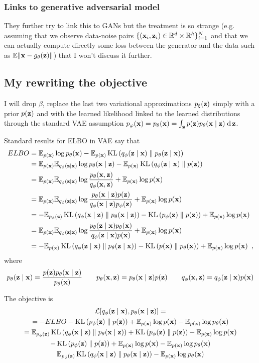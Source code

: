 \subsubsection{Links to generative adversarial model}

They further try to link this to GANs but the treatment is so strange (e.g. assuming that we observe data-noise pairs $\{(\bx_i, \bz_i) \in \mR^d \times \mR^h\}_{i=1}^N$ and that we can actually compute directly some loss between the generator and the data such as $\mE \norm{\bx - g_\theta(\bz)}$) that I won't discuss it further.

\subsection{My rewriting the objective}

I will drop $\beta$, replace the last two variational approximations $\pxz$ simply with a prior $p(\bz)$ and with the learned likelihood linked to the learned distributions through the standard VAE assumption
$p_\varphi(\bx) = p_\theta(\bx) = \int_\bz p(\bz) p_\theta(\bx \mid \bz) \dif \bz$.

Standard results for ELBO in VAE say that
\begin{align*}
ELBO & = \mE_{p(\bx)} \log p_\theta(\bx) - \mE_{p(\bx)} \KL{\qfz}{p_\theta(\bz \mid \bx)} \nn
& = \mE_{p(\bx)} \mE_{\qfz} \log \ptx - \mE_{p(\bx)} \KL{\qfz}{p(\bz)} \nn
& = \mE_{p(\bx)} \mE_{\qfz} \log \frac{p_\theta(\bx, \bz)}{q_\phi(\bx, \bz)} + \mE_{p(\bx)} \log p(\bx) \nn
& = \mE_{p(\bx)} \mE_{\qfz} \log \frac{p_\theta(\bx \mid \bz) p(\bz)}{q_\phi(\bx \mid \bz) p_\phi(\bz)} + \mE_{p(\bx)} \log p(\bx) \nn
& = - \mE_{p_\phi(\bz)} \KL{q_\phi(\bx \mid \bz)}{p_\theta(\bx \mid \bz)}  - \KL{p_\phi(\bz)}{p(\bz)} + \mE_{p(\bx)} \log p(\bx) \\
& = \mE_{p(\bx)} \mE_{\qfz} \log \frac{p_\theta(\bz \mid \bx) p_\theta(\bx)}{q_\phi(\bz \mid \bx) p(\bx)} + \mE_{p(\bx)} \log p(\bx) \nn
& = - \mE_{p(\bx)} \KL{q_\phi(\bz \mid \bx)}{p_\theta(\bz \mid \bx)}  - \KL{p(\bx)}{p_\theta(\bx)} + \mE_{p(\bx)} \log p(\bx)
\enspace ,
\end{align*}
where 
\begin{equation}
p_\theta(\bz \mid \bx) = \frac{p(\bz) \ptx}{p_\theta(\bx)} \qquad 
p_\theta(\bx, \bz) = \ptx p(\bz)
\qquad 
q_\phi(\bx, \bz) = \qfz p(\bx)
\end{equation}


The objective is
\begin{gather*}
\mL[\qfz, \ptx] = \\
= - ELBO - \KL{p_\phi(\bz)}{p(\bz)} + \mE_{p(\bx)} \log p(\bx) - \mE_{p(\bx)} \log p_\theta(\bx) \nn
=  \mE_{p_\phi(\bz)} \KL{q_\phi(\bx \mid \bz)}{p_\theta(\bx \mid \bz)}  + \KL{p_\phi(\bz)}{p(\bz)} - \mE_{p(\bx)} \log p(\bx) \\
- \KL{p_\phi(\bz)}{p(\bz)} + \mE_{p(\bx)} \log p(\bx) - \mE_{p(\bx)} \log p_\theta(\bx) \\
\mE_{p_\phi(\bz)} \KL{q_\phi(\bx \mid \bz)}{p_\theta(\bx \mid \bz)} - \mE_{p(\bx)} \log p_\theta(\bx)
\end{gather*}

